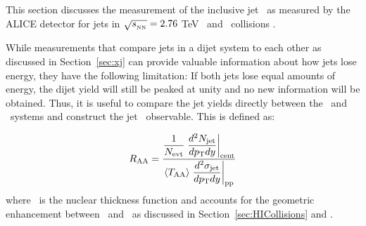 
This section discusses the measurement of the inclusive jet \RAA\ as measured by the ALICE detector for jets in $\mbox{$\sqrt{s_{_\text{NN}}}$}=2.76$ TeV \pbpb\ and \pp\ collisions \cite{Reed_2013}.

While measurements that compare jets in a dijet system to each other as discussed in Section~\ref{sec:xj} can provide valuable information about how jets lose energy, they have the following limitation: If both jets lose equal amounts of energy, the dijet yield will still be peaked at unity and no new information will be obtained.
Thus, it is useful to compare the jet yields directly between the \pp\ and \pbpb\ systems and construct the jet \RAA\ observable.
This is defined as:

\begin{align}
\mbox{$R_{\rm AA}$}  = \dfrac{\dfrac{1}{N_{\rm evt}} \left.
\dfrac{d^2 N_{\rm jet}}{d\mbox{$p_{\mathrm{T}}$} dy} \right|_{\rm cent}}{ \langle T_{\rm AA} \rangle \left.
\dfrac{d^2\sigma_{\rm jet}}{d\mbox{$p_{\mathrm{T}}$} dy} \right|_{\rm pp}}
\end{align}
where \TAA\ is the nuclear thickness function and accounts for the geometric enhancement between \pp\ and \pbpb\ as discussed in Section~\ref{sec:HICollisions} and \cite{doi:10.1146/annurev.nucl.57.090506.123020}.

